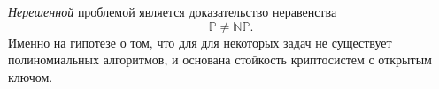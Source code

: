 \documentclass[10pt,a4paper]{book}
\newcommand{\set}[1]{\mathbb{#1}}
\begin{document}
\emph{Нерешенной} проблемой является доказательство неравенства
    \[ \set{P} \neq \set{NP}. \]
Именно на гипотезе о том, что для для некоторых задач не существует полиномиальных алгоритмов, и основана стойкость криптосистем с открытым ключом.



%
%
%
%
%
%
%
%
%

\clearpage
{}
{}
\printindex

\clearpage
{}
{}


\end{document}
